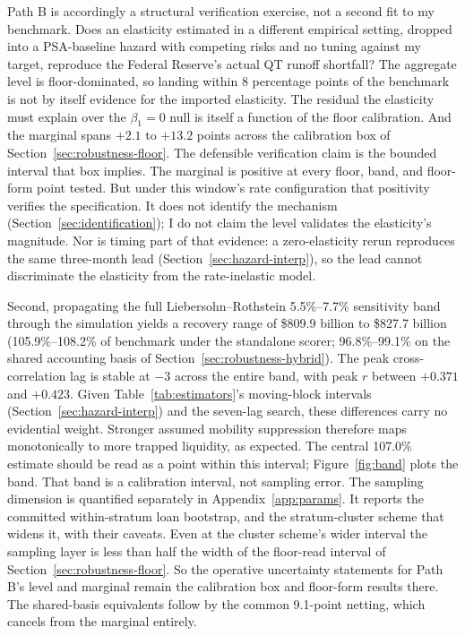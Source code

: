 \documentclass[12pt]{article}
\begin{document}
Path B is accordingly a structural verification exercise, not a second fit to my benchmark. Does an elasticity estimated in a different empirical setting, dropped into a PSA-baseline hazard with competing risks and no tuning against my target, reproduce the Federal Reserve's actual QT runoff shortfall? The aggregate level is floor-dominated, so landing within 8 percentage points of the benchmark is not by itself evidence for the imported elasticity. The residual the elasticity must explain over the $\beta_1 = 0$ null is itself a function of the floor calibration. And the marginal spans $+2.1$ to $+13.2$ points across the calibration box of Section~\ref{sec:robustness-floor}. The defensible verification claim is the bounded interval that box implies. The marginal is positive at every floor, band, and floor-form point tested. But under this window's rate configuration that positivity verifies the specification. It does not identify the mechanism (Section~\ref{sec:identification}); I do not claim the level validates the elasticity's magnitude. Nor is timing part of that evidence: a zero-elasticity rerun reproduces the same three-month lead (Section~\ref{sec:hazard-interp}), so the lead cannot discriminate the elasticity from the rate-inelastic model.

Second, propagating the full Liebersohn--Rothstein 5.5\%--7.7\% sensitivity band through the simulation yields a recovery range of \$809.9 billion to \$827.7 billion (105.9\%--108.2\% of benchmark under the standalone scorer; 96.8\%--99.1\% on the shared accounting basis of Section~\ref{sec:robustness-hybrid}). The peak cross-correlation lag is stable at $-3$ across the entire band, with peak $r$ between $+0.371$ and $+0.423$. Given Table~\ref{tab:estimators}'s moving-block intervals (Section~\ref{sec:hazard-interp}) and the seven-lag search, these differences carry no evidential weight. Stronger assumed mobility suppression therefore maps monotonically to more trapped liquidity, as expected. The central 107.0\% estimate should be read as a point within this interval; Figure~\ref{fig:band} plots the band. That band is a calibration interval, not sampling error. The sampling dimension is quantified separately in Appendix~\ref{app:params}. It reports the committed within-stratum loan bootstrap, and the stratum-cluster scheme that widens it, with their caveats. Even at the cluster scheme's wider interval the sampling layer is less than half the width of the floor-read interval of Section~\ref{sec:robustness-floor}. So the operative uncertainty statements for Path B's level and marginal remain the calibration box and floor-form results there. The shared-basis equivalents follow by the common 9.1-point netting, which cancels from the marginal entirely.
\end{document}
